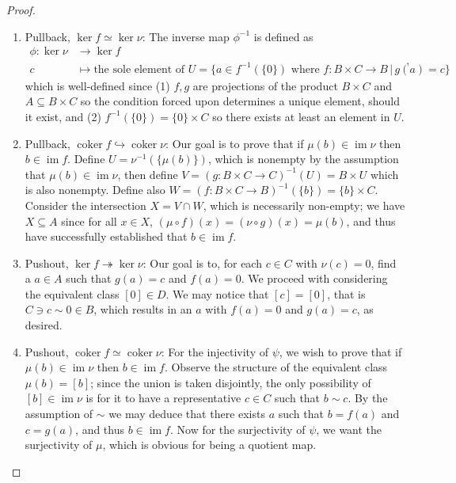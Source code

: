 \documentclass[10pt]{report}
\theoremstyle{definition}
\begin{document}
\begin{proof}\leavevmode
\begin{enumerate}
\item Pullback, $\ker f\simeq\ker\nu$:
The inverse map $\phi^{-1}$ is defined as
$$\begin{aligned}
\phi:\ker\nu&\to\ker f\\
c&\mapsto\text{the sole element of }U=\{a\in f^{-1}(\{0\})\text{ where }f:B\times C\to B\,\big|\,g(a)=c\}
\end{aligned},$$
which is well-defined since (1) $f,g$ are projections of the product $B\times C$ and $A\subseteq B\times C$ so the condition forced upon determines a unique element, should it exist, and (2) $f^{-1}(\{0\})=\{0\}\times C$ so there exists at least an element in $U$.
\item Pullback, $\operatorname{coker}f\hookrightarrow\operatorname{coker}\nu$:
Our goal is to prove that if $\mu(b)\in\operatorname{im}\nu$ then $b\in\operatorname{im}f$. Define $U=\nu^{-1}(\{\mu(b)\})$, which is nonempty by the assumption that $\mu(b)\in\operatorname{im}\nu$, then define $V=(g:B\times C\to C)^{-1}(U)=B\times U$ which is also nonempty. Define also $W=(f:B\times C\to B)^{-1}(\{b\})=\{b\}\times C$. Consider the intersection $X=V\cap W$, which is necessarily non-empty; we have $X\subseteq A$ since for all $x\in X$, $(\mu\circ f)(x)=(\nu\circ g)(x)=\mu(b)$, and thus have successfully established that $b\in\operatorname{im}f$.

\item Pushout, $\ker f\twoheadrightarrow\ker\nu$:
Our goal is to, for each $c\in C$ with $\nu(c)=0$, find a $a\in A$ such that $g(a)=c$ and $f(a)=0$. We proceed with considering the equivalent class $[0]\in D$. We may notice that $[c]=[0]$, that is $C\ni c\sim0\in B$, which results in an $a$ with $f(a)=0$ and $g(a)=c$, as desired.

\item Pushout, $\operatorname{coker}f\simeq\operatorname{coker}\nu$:
For the injectivity of $\psi$, we wish to prove that if $\mu(b)\in\operatorname{im}\nu$ then $b\in\operatorname{im}f$. Observe the structure of the equivalent class $\mu(b)=[b]$; since the union is taken disjointly, the only possibility of $[b]\in\operatorname{im}\nu$ is for it to have a representative $c\in C$ such that $b\sim c$. By the assumption of $\sim$ we may deduce that there exists $a$ such that $b=f(a)$ and $c=g(a)$, and thus $b\in\operatorname{im}f$. Now for the surjectivity of $\psi$, we want the surjectivity of $\mu$, which is obvious for being a quotient map.
\end{enumerate}
\end{proof}
\end{document}
